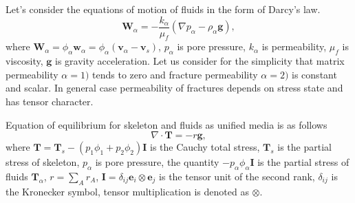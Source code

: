 \documentclass[article,authoryear,jpm]{beg_39}             %
\begin{document}
Let’s consider the equations of motion of fluids in the form of Darcy’s law.
\begin{equation}
{{\mathbf{W}}_{\alpha }}=-\frac{{{k}_{\alpha }}}{{{\mu }_{f}}}\left( \nabla {{p}_{\alpha }}-{{\rho }_{\alpha }}\mathbf{g} \right),
\end{equation}
where ${{\mathbf{W}}_{\alpha }}={{\phi }_{\alpha }}{{\mathbf{w}}_{\alpha }}={{\phi }_{\alpha }}\left( {{\mathbf{v}}_{\alpha }}-{{\mathbf{v}}_{s}} \right)$, ${{p}_{\alpha }}$ is pore pressure, ${{k}_{\alpha }}$ is permeability, ${{\mu }_{f}}$ is viscosity, $\mathbf{g}$ is gravity acceleration. Let us consider for the simplicity that matrix permeability ${\alpha}=1)$ tends to zero and fracture permeability ${\alpha}=2)$ is constant and scalar.
In general case permeability of fractures depends on stress state and has tensor character.

Equation of equilibrium for skeleton and fluids as unified media is as follows
\begin{equation}
\nabla \cdot \mathbf{T}=-r\mathbf{g},
\end{equation}
where $\mathbf{T}={{\mathbf{T}}_{s}}-\left( {{p}_{1}}{{\phi }_{1}}+{{p}_{2}}{{\phi }_{2}} \right)\mathbf{I}$ is the Cauchy total stress, ${{\mathbf{T}}_{s}}$ is the partial stress of skeleton, ${{p}_{\alpha }}$ is pore pressure, the quantity $-{{p}_{\alpha }}{{\phi }_{\alpha }}\mathbf{I}$ is the partial stress of fluids ${{\mathbf{T}}_{\alpha }}$, $r=\sum\limits_{A}{{{r}_{A}}}$, $\mathbf{I}={{\delta }_{ij}}{{\mathbf{e}}_{i}}\otimes {{\mathbf{e}}_{j}}$ is the tensor unit of the second rank, ${{\delta }_{ij}}$ is the Kronecker symbol, tensor multiplication is denoted as $\otimes$.
\end{document}
